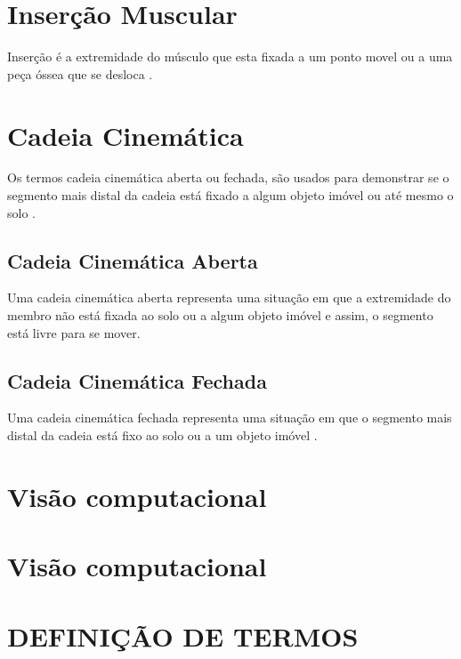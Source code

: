 \section[Inserção Muscular]{Inserção Muscular}
Inserção é a extremidade do músculo que esta fixada a um ponto movel ou a uma peça óssea que se desloca \cite{sisMuscular}.

\section[Cadeia Cinemática]{Cadeia Cinemática}
Os termos cadeia cinemática aberta ou fechada, são usados para demonstrar se o segmento mais distal da cadeia está fixado a algum objeto imóvel ou até mesmo o solo \cite{silva2015cinesiologia}.

\subsection[Cadeia Cinemática Aberta]{Cadeia Cinemática Aberta}
Uma cadeia cinemática aberta representa uma situação em que a extremidade do membro não está fixada ao solo ou a algum objeto imóvel e assim, o segmento está livre para se mover\cite{silva2015cinesiologia}.

\subsection[Cadeia Cinemática Fechada]{Cadeia Cinemática Fechada}
Uma cadeia cinemática fechada representa uma situação em que o segmento mais distal da cadeia está fixo ao solo ou a um objeto imóvel \cite{silva2015cinesiologia}.







\section[TERMOS]{Visão computacional}

\section[TERMOS]{Visão computacional}

\section[TERMOS]{DEFINIÇÃO DE TERMOS}






